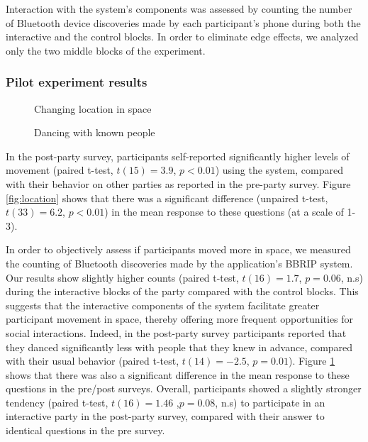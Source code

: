 \documentclass[a4paper,11pt]{article}
\begin{document}
{Interaction with the system's components was assessed by counting the number of Bluetooth device discoveries made by each participant's phone during both the interactive and the control blocks.
In order to eliminate edge effects, we analyzed only the two middle blocks of the experiment.

\subsubsection{Pilot experiment results}

\begin{figure}[!htb]
	\def\svgwidth{0.95\columnwidth}
  	
	\caption{Changing location in space}\label{fig:location}
\endminipage\hfill
{}
	\def\svgwidth{0.95\columnwidth}
	
	\caption{Dancing with known people}\label{fig:known}
\endminipage\hfill
\end{figure}

In the post-party survey, participants self-reported significantly higher levels of movement (paired t-test, $t(15)=3.9$, $p<0.01$) using the system, compared with their behavior on other parties as reported in the pre-party survey.
Figure \ref{fig:location} shows that there was a significant difference (unpaired t-test, $t(33)=6.2$, $p<0.01$) in the mean response to these questions (at a scale of 1-3).

In order to objectively assess if participants moved more in space, we measured the counting of Bluetooth discoveries made by the application's BBRIP system.
Our results show slightly higher counts (paired t-test, $t(16)=1.7$, $p=0.06$, n.s) during the interactive blocks of the party compared with the control blocks. This suggests that the interactive components of the system facilitate greater participant movement in space, thereby offering more frequent opportunities for social interactions.
Indeed, in the post-party survey participants reported that they danced significantly less with people that they knew in advance, compared with their usual behavior (paired t-test, $t(14)=-2.5$, $p=0.01$).
Figure \ref{fig:known} shows that there was also a significant difference in the mean response to these questions in the pre/post surveys.
Overall, participants showed a slightly stronger tendency (paired t-test, $t(16)=1.46$ ,$p=0.08$, n.s) to participate in an interactive party in the post-party survey, compared with their answer to identical questions in the pre survey.

}
\end{document}
